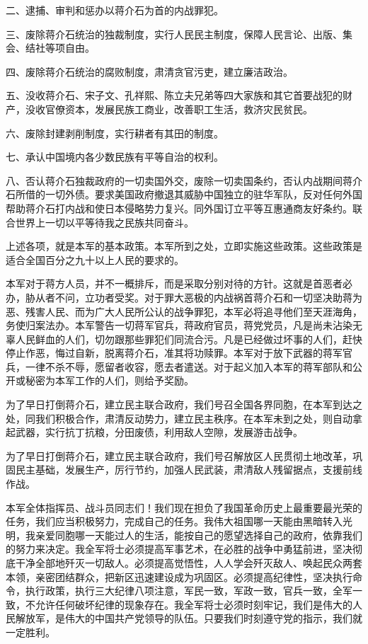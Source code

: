 二、逮捕、审判和惩办以蒋介石为首的内战罪犯。

三、废除蒋介石统治的独裁制度，实行人民民主制度，保障人民言论、出版、集会、结社等项自由。

四、废除蒋介石统治的腐败制度，肃清贪官污吏，建立廉洁政治。

五、没收蒋介石、宋子文、孔祥熙、陈立夫兄弟等四大家族和其它首要战犯的财产，没收官僚资本，发展民族工商业，改善职工生活，救济灾民贫民。

六、废除封建剥削制度，实行耕者有其田的制度。

七、承认中国境内各少数民族有平等自治的权利。

八、否认蒋介石独裁政府的一切卖国外交，废除一切卖国条约，否认内战期间蒋介石所借的一切外债。要求美国政府撤退其威胁中国独立的驻华军队，反对任何外国帮助蒋介石打内战和使日本侵略势力复兴。同外国订立平等互惠通商友好条约。联合世界上一切以平等待我之民族共同奋斗。

上述各项，就是本军的基本政策。本军所到之处，立即实施这些政策。这些政策是适合全国百分之九十以上人民的要求的。

本军对于蒋方人员，并不一概排斥，而是采取分别对待的方针。这就是首恶者必办，胁从者不问，立功者受奖。对于罪大恶极的内战祸首蒋介石和一切坚决助蒋为恶、残害人民、而为广大人民所公认的战争罪犯，本军必将追寻他们至天涯海角，务使归案法办。本军警告一切蒋军官兵，蒋政府官员，蒋党党员，凡是尚未沾染无辜人民鲜血的人们，切勿跟那些罪犯们同流合污。凡是已经做过坏事的人们，赶快停止作恶，悔过自新，脱离蒋介石，准其将功赎罪。本军对于放下武器的蒋军官兵，一律不杀不辱，愿留者收容，愿去者遣送。对于起义加入本军的蒋军部队和公开或秘密为本军工作的人们，则给予奖励。

为了早日打倒蒋介石，建立民主联合政府，我们号召全国各界同胞，在本军到达之处，同我们积极合作，肃清反动势力，建立民主秩序。在本军未到之处，则自动拿起武器，实行抗丁抗粮，分田废债，利用敌人空隙，发展游击战争。

为了早日打倒蒋介石，建立民主联合政府，我们号召解放区人民贯彻土地改革，巩固民主基础，发展生产，厉行节约，加强人民武装，肃清敌人残留据点，支援前线作战。

本军全体指挥员、战斗员同志们！我们现在担负了我国革命历史上最重要最光荣的任务，我们应当积极努力，完成自己的任务。我伟大祖国哪一天能由黑暗转入光明，我亲爱同胞哪一天能过人的生活，能按自己的愿望选择自己的政府，依靠我们的努力来决定。我全军将士必须提高军事艺术，在必胜的战争中勇猛前进，坚决彻底干净全部地歼灭一切敌人。必须提高觉悟性，人人学会歼灭敌人、唤起民众两套本领，亲密团结群众，把新区迅速建设成为巩固区。必须提高纪律性，坚决执行命令，执行政策，执行三大纪律八项注意，军民一致，军政一致，官兵一致，全军一致，不允许任何破坏纪律的现象存在。我全军将士必须时刻牢记，我们是伟大的人民解放军，是伟大的中国共产党领导的队伍。只要我们时刻遵守党的指示，我们就一定胜利。


